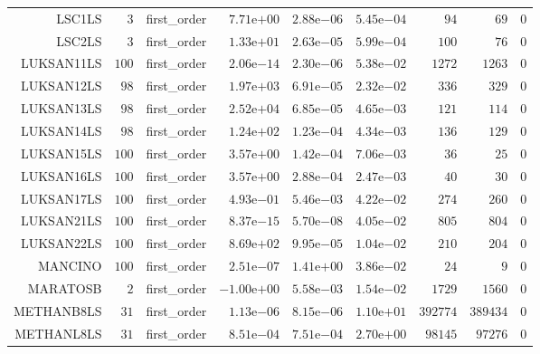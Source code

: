 \begin{longtable}{rrrrrrrrr}
LSC1LS & \(     3\) & first\_order & \( 7.71\)e\(+00\) & \( 2.88\)e\(-06\) & \( 5.45\)e\(-04\) & \(    94\) & \(    69\) & \(     0\) \\
LSC2LS & \(     3\) & first\_order & \( 1.33\)e\(+01\) & \( 2.63\)e\(-05\) & \( 5.99\)e\(-04\) & \(   100\) & \(    76\) & \(     0\) \\
LUKSAN11LS & \(   100\) & first\_order & \( 2.06\)e\(-14\) & \( 2.30\)e\(-06\) & \( 5.38\)e\(-02\) & \(  1272\) & \(  1263\) & \(     0\) \\
LUKSAN12LS & \(    98\) & first\_order & \( 1.97\)e\(+03\) & \( 6.91\)e\(-05\) & \( 2.32\)e\(-02\) & \(   336\) & \(   329\) & \(     0\) \\
LUKSAN13LS & \(    98\) & first\_order & \( 2.52\)e\(+04\) & \( 6.85\)e\(-05\) & \( 4.65\)e\(-03\) & \(   121\) & \(   114\) & \(     0\) \\
LUKSAN14LS & \(    98\) & first\_order & \( 1.24\)e\(+02\) & \( 1.23\)e\(-04\) & \( 4.34\)e\(-03\) & \(   136\) & \(   129\) & \(     0\) \\
LUKSAN15LS & \(   100\) & first\_order & \( 3.57\)e\(+00\) & \( 1.42\)e\(-04\) & \( 7.06\)e\(-03\) & \(    36\) & \(    25\) & \(     0\) \\
LUKSAN16LS & \(   100\) & first\_order & \( 3.57\)e\(+00\) & \( 2.88\)e\(-04\) & \( 2.47\)e\(-03\) & \(    40\) & \(    30\) & \(     0\) \\
LUKSAN17LS & \(   100\) & first\_order & \( 4.93\)e\(-01\) & \( 5.46\)e\(-03\) & \( 4.22\)e\(-02\) & \(   274\) & \(   260\) & \(     0\) \\
LUKSAN21LS & \(   100\) & first\_order & \( 8.37\)e\(-15\) & \( 5.70\)e\(-08\) & \( 4.05\)e\(-02\) & \(   805\) & \(   804\) & \(     0\) \\
LUKSAN22LS & \(   100\) & first\_order & \( 8.69\)e\(+02\) & \( 9.95\)e\(-05\) & \( 1.04\)e\(-02\) & \(   210\) & \(   204\) & \(     0\) \\
MANCINO & \(   100\) & first\_order & \( 2.51\)e\(-07\) & \( 1.41\)e\(+00\) & \( 3.86\)e\(-02\) & \(    24\) & \(     9\) & \(     0\) \\
MARATOSB & \(     2\) & first\_order & \(-1.00\)e\(+00\) & \( 5.58\)e\(-03\) & \( 1.54\)e\(-02\) & \(  1729\) & \(  1560\) & \(     0\) \\
METHANB8LS & \(    31\) & first\_order & \( 1.13\)e\(-06\) & \( 8.15\)e\(-06\) & \( 1.10\)e\(+01\) & \(392774\) & \(389434\) & \(     0\) \\
METHANL8LS & \(    31\) & first\_order & \( 8.51\)e\(-04\) & \( 7.51\)e\(-04\) & \( 2.70\)e\(+00\) & \( 98145\) & \( 97276\) & \(     0\) \\

\end{longtable}
